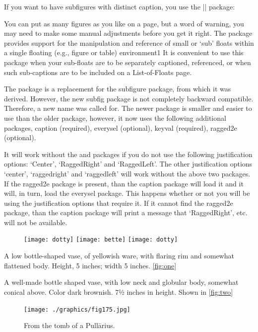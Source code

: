 \begin{dispListing}
If you want to have subfigures with distinct caption, you use the |\subfig| package:


You can put as many figures as you like on a page, but a word of warning, you may need to make some manual adjustments before you get it right. The package provides support for the manipulation and reference of small or ‘sub’ floats within a single floating (e.g., figure or table) environment1 It is convenient to use this
package when your sub-floats are to be separately captioned, referenced, or when such
sub-captions are to be included on a List-of-Floats page.

The package is a replacement for the subfigure package, from which it was derived.
However, the new subfig package is not completely backward compatible.
Therefore, a new name was called for. The newer package is smaller and easier to use
than the older package, however, it now uses the following additional packages, 
caption (required), 
everysel (optional), 
keyval (required), 
ragged2e (optional).

It will work without the  and  packages if you do not use the following
justification options: ‘Center’, ‘RaggedRight’ and ‘RaggedLeft’. The other justification
options ‘center’, ‘raggedright’ and ‘raggedleft’ will work without the above two packages. If the ragged2e package is present, than the caption package will load it and it
will, in turn, load the everysel package. This happens whether or not you will be using
the justification options that require it. If it cannot find the ragged2e package, than the
caption package will print a message that ‘RaggedRight’, etc. will not be available.


\begin{figure}[htb]
\texttt{[image: dotty]}
\texttt{[image: bette]}
\texttt{[image: dotty]}
\end{figure}

 A low bottle-shaped vase, of yellowish ware, with flaring rim and somewhat flattened body. Height, 5 inches; width 5 inches. \ref{fig:one}

A well-made bottle shaped vase, with low neck and globular body, somewhat conical above. Color dark brownish. 7½ inches in height. Shown in \ref{fig:two}


\begin{figure}
  \centering
  \texttt{[image: ./graphics/fig175.jpg]}
   \centerline{From the tomb of a Pull\= arius.}
  \label{fig:marginfig1}
\end{figure}


\end{dispListing}
